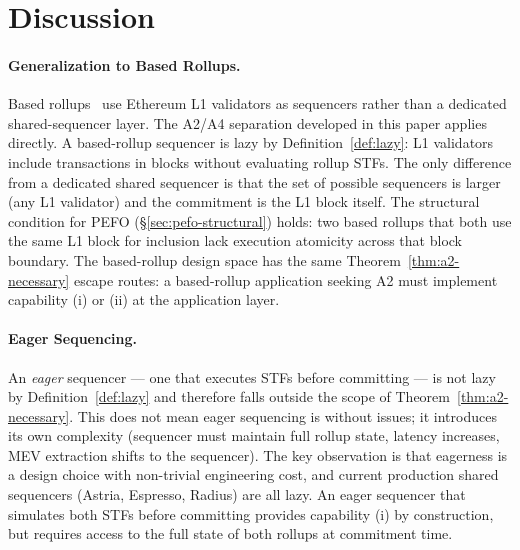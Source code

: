 %

\section{Discussion}
\label{sec:discussion}

\paragraph{Generalization to Based Rollups.}
Based rollups~\cite{justin-based-rollups} use Ethereum L1 validators as
sequencers rather than a dedicated shared-sequencer layer. The A2/A4 separation
developed in this paper applies directly. A based-rollup sequencer is lazy by
Definition~\ref{def:lazy}: L1 validators include transactions in blocks without
evaluating rollup STFs. The only difference from a dedicated shared sequencer is
that the set of possible sequencers is larger (any L1 validator) and the
commitment is the L1 block itself. The structural condition for PEFO
(\S\ref{sec:pefo-structural}) holds: two based rollups that both use the same
L1 block for inclusion lack execution atomicity across that block boundary.
The based-rollup design space has the same Theorem~\ref{thm:a2-necessary}
escape routes: a based-rollup application seeking A2 must implement capability
(i) or (ii) at the application layer.

\paragraph{Eager Sequencing.}
An \emph{eager} sequencer --- one that executes STFs before committing --- is not
lazy by Definition~\ref{def:lazy} and therefore falls outside the scope of
Theorem~\ref{thm:a2-necessary}. This does not mean eager sequencing is without
issues; it introduces its own complexity (sequencer must maintain full rollup
state, latency increases, MEV extraction shifts to the sequencer). The key
observation is that eagerness is a design choice with non-trivial engineering
cost, and current production shared sequencers (Astria, Espresso, Radius) are
all lazy. An eager sequencer that simulates both STFs before committing provides
capability (i) by construction, but requires access to the full state of both
rollups at commitment time.

